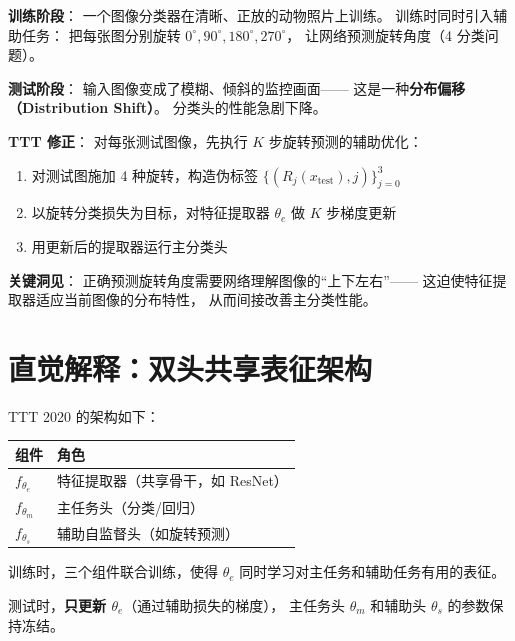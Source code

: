 \begin{toybox}[title=玩具问题 B：旋转预测实现域适应]
\textbf{训练阶段}：
一个图像分类器在清晰、正放的动物照片上训练。
训练时同时引入辅助任务：
把每张图分别旋转 $0^\circ, 90^\circ, 180^\circ, 270^\circ$，
让网络预测旋转角度（4 分类问题）。

\textbf{测试阶段}：
输入图像变成了模糊、倾斜的监控画面——
这是一种\textbf{分布偏移（Distribution Shift）}。
分类头的性能急剧下降。

\textbf{TTT 修正}：
对每张测试图像，先执行 $K$ 步旋转预测的辅助优化：
\begin{enumerate}
  \item 对测试图施加 4 种旋转，构造伪标签
        $\{(R_j(x_\text{test}), j)\}_{j=0}^{3}$
  \item 以旋转分类损失为目标，对特征提取器 $\theta_e$ 做 $K$ 步梯度更新
  \item 用更新后的提取器运行主分类头
\end{enumerate}

\textbf{关键洞见}：
正确预测旋转角度需要网络理解图像的``上下左右''——
这迫使特征提取器适应当前图像的分布特性，
从而间接改善主分类性能。
\end{toybox}

\section{直觉解释：双头共享表征架构}
\label{sec:why_test_time_intuition}

TTT 2020 的架构如下：

\begin{center}
\begin{tabular}{ll}
\toprule
\textbf{组件} & \textbf{角色} \\
\midrule
$f_{\theta_e}$ & 特征提取器（共享骨干，如 ResNet） \\
$f_{\theta_m}$ & 主任务头（分类/回归） \\
$f_{\theta_s}$ & 辅助自监督头（如旋转预测） \\
\bottomrule
\end{tabular}
\end{center}

训练时，三个组件联合训练，使得 $\theta_e$ 同时学习对主任务和辅助任务有用的表征。

测试时，\textbf{只更新 $\theta_e$}（通过辅助损失的梯度），
主任务头 $\theta_m$ 和辅助头 $\theta_s$ 的参数保持冻结。

